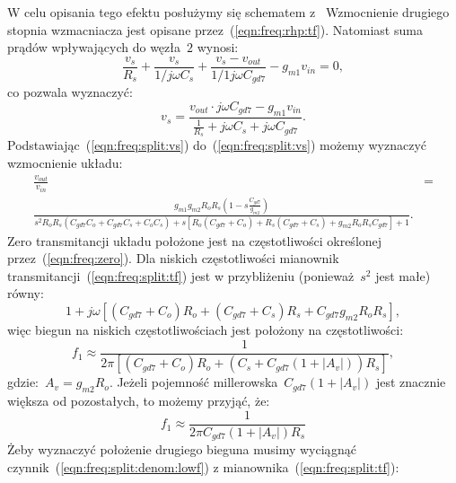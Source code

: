 \documentclass[twoside,pl,final]{labman}
\begin{document}
W celu opisania tego efektu posłużymy się
schematem z~
Wzmocnienie drugiego stopnia wzmacniacza jest opisane
przez~(\ref{eqn:freq:rhp:tf}).
Natomiast suma prądów wpływających do węzła~$2$ wynosi:
\begin{equation}
  \frac{v_s}{R_s} +
  \frac{v_s}{1 / j \omega C_s} +
  \frac{v_s - v_{out}}{1 / 1 j \omega C_{gd7}} -
  g_{m1} v_{in} = 0,
  \label{eqn:freq:split:kirchoff}
\end{equation}
co pozwala wyznaczyć:
\begin{equation}
  v_s = \frac{v_{out} \cdot j \omega C_{gd7} - g_{m1} v_{in}}
        {\frac{1}{R_s} + j \omega C_s + j \omega C_{gd7}}.
  \label{eqn:freq:split:vs}
\end{equation}
Podstawiając~(\ref{eqn:freq:split:vs}) do~(\ref{eqn:freq:split:vs})
możemy wyznaczyć wzmocnienie układu:
\begin{align}
  \frac{v_{out}}{v_{in}} &= \nonumber \\
  \frac{g_{m1} g_{m2} R_o R_s (1 - s \frac{C_{gd7}}{g_{m2}})}
    {s^2 R_o R_s (C_{gd7} C_o + C_{gd7} C_s + C_o C_s) +
    s[R_o (C_{gd7} + C_o) + R_s (C_{gd7} + C_s) + g_{m2} R_o R_s C_{gd7}] + 1}.
  \label{eqn:freq:split:tf}
\end{align}
Zero transmitancji układu położone jest na
częstotliwości określonej przez~(\ref{eqn:freq:zero}).
Dla niskich częstotliwości mianownik
transmitancji~(\ref{eqn:freq:split:tf})
jest w przybliżeniu (ponieważ~$s^2$ jest małe) równy:
\begin{equation}
  1 + j \omega [(C_{gd7} + C_o) R_o +
                (C_{gd7} + C_s) R_s +
                C_{gd7} g_{m2} R_o R_s],
  \label{eqn:freq:split:denom:lowf}
\end{equation}
więc biegun na niskich częstotliwościach jest położony na częstotliwości:
\begin{equation}
  f_1 \approx \frac{1}{2 \pi [(C_{gd7} + C_o) R_o +
                              (C_s + C_{gd7} (1 + |A_v|)) R_s]},
  \label{eqn:freq:split:pole:low}
\end{equation}
gdzie:~$A_v = g_{m2} R_o$.
Jeżeli pojemność millerowska~$C_{gd7} (1 + |A_v|)$ jest
znacznie większa od pozostałych, to możemy przyjąć, że:
\begin{equation}
  f_1 \approx \frac{1}{2 \pi C_{gd7} (1 + |A_v|) R_s}
  \label{eqn:freq:split:pole:low:approx}
\end{equation}
Żeby wyznaczyć położenie drugiego bieguna musimy
wyciągnąć czynnik~(\ref{eqn:freq:split:denom:lowf})
z mianownika~(\ref{eqn:freq:split:tf}):
\end{document}
